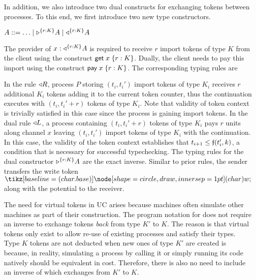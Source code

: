 In addition, we also introduce two dual constructs for exchanging tokens
between processes.
To this end, we first introduce two new type constructors.
\begin{center}
\begin{minipage}{0cm}
\begin{tabbing}
$A ::= \ldots \mid \tpaypot{A}{r : K} \mid \tgetpot{A}{r : K}$
\end{tabbing}
\end{minipage}
\end{center}
The provider of $x : \tgetpot{A}{r : K}$ is required to receive
$r$ import tokens of type $K$ from the client using the construct
$\eget{x}{r : K}$. Dually, the client needs to pay this import
using the construct $\epay{x}{r : K}$.
The corresponding typing rules are
In the rule $\getpot R$, process $P$ storing $(t_i, t_i')$ import tokens of type $K_i$
receives $r$ additional $K_i$ tokens adding it to the current token counter, thus
the continuation executes with $(t_i, t_i'+r)$ tokens of type $K_i$.
Note that validity of token context is trivially satisfied in this case since the
process is gaining import tokens.
%
In the dual rule $\getpot L$, a process containing $(t_i, t_i'+r)$ tokens of type $K_i$
pays $r$ units along channel $x$ leaving $(t_i, t_i')$ import tokens of type $K_i$ with
the continuation.
In this case, the validity of the token context establishes that $t_{i+1} \leq \GlobalF(t_i',k)$,
a condition that is necessary for successful typechecking.
The typing rules for the dual constructor $\tpaypot{A}{r : K}$
are the exact inverse.
Similar to prior rules, the sender transfers the write token $\wt$
along with the potential to the receiver.

The need for virtual tokens in UC arises because machines often simulate
other machines as part of their construction. The program notation for 
does not require an inverse to exchange tokens \textit{back} from type $K'$ to $K$.
The reason is that virtual tokens only exist to allow re-use of existing processes 
and satisfy their types. Type $K$ tokens are not deducted when new ones of type $K'$ 
are created is because, in reality, simulating a process by calling it or simply running
its code natively should be equivalent in cost. Therefore, there is also no need to 
include an inverse of  which exchanges from $K'$ to $K$.

